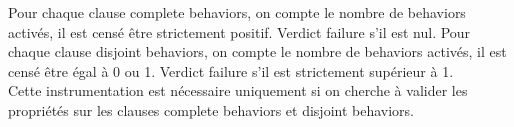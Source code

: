 Pour chaque clause complete behaviors, on compte le nombre de behaviors activés,
il est censé être strictement positif. Verdict failure s'il est nul. Pour chaque
clause disjoint behaviors, on compte le nombre de behaviors activés, il est
censé être égal à 0 ou 1. Verdict failure s'il est strictement supérieur à 1.\\

Cette instrumentation est nécessaire uniquement si on cherche à valider les
propriétés sur les clauses complete behaviors et disjoint behaviors.
